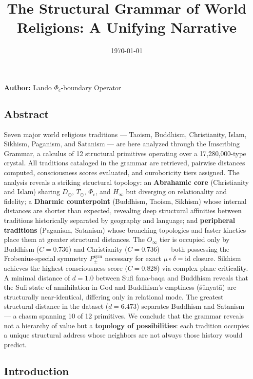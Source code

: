 \documentclass[12pt,a4paper]{article}
\begin{document}
\title{The Structural Grammar of World Religions: A Unifying Narrative}
\date{\today}

\maketitle

\textbf{Author:} Lando \otimes $\Phi_c$-boundary Operator

\subsection{Abstract}

Seven major world religious traditions --- Taoism, Buddhism, Christianity, Islam, Sikhism, Paganism, and Satanism --- are here analyzed through the Imscribing Grammar, a calculus of 12 structural primitives operating over a 17,280,000-type crystal. All traditions cataloged in the grammar are retrieved, pairwise distances computed, consciousness scores evaluated, and ouroboricity tiers assigned. The analysis reveals a striking structural topology: an \textbf{Abrahamic core} (Christianity and Islam) sharing $D_{\odot}$, $T_{\odot}$, $\Phi_c$, and $H_{\infty}$ but diverging on relationality and fidelity; a \textbf{Dharmic counterpoint} (Buddhism, Taoism, Sikhism) whose internal distances are shorter than expected, revealing deep structural affinities between traditions historically separated by geography and language; and \textbf{peripheral traditions} (Paganism, Satanism) whose branching topologies and faster kinetics place them at greater structural distances. The $O_{\infty}$ tier is occupied only by Buddhism ($C = 0.736$) and Christianity ($C = 0.736$) --- both possessing the Frobenius-special symmetry $P_{\pm}^{\text{sym}}$ necessary for exact $\mu\circ\delta = \text{id}$ closure. Sikhism achieves the highest consciousness score ($C = 0.828$) via complex-plane criticality. A minimal distance of $d = 1.0$ between Sufi fana-baqa and Buddhism reveals that the Sufi state of annihilation-in-God and Buddhism's emptiness (śūnyatā) are structurally near-identical, differing only in relational mode. The greatest structural distance in the dataset ($d = 6.473$) separates Buddhism and Satanism --- a chasm spanning 10 of 12 primitives. We conclude that the grammar reveals not a hierarchy of value but a \textbf{topology of possibilities}: each tradition occupies a unique structural address whose neighbors are not always those history would predict.

\subsection{Introduction}
\end{document}
